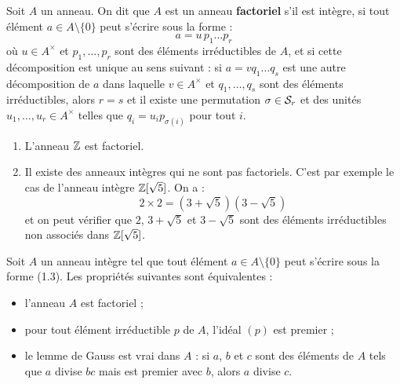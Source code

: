\documentclass[]{report}
\begin{document}
\begin{df}{}{}
    Soit $A$ un anneau. On dit que $A$ est un anneau \textbf{factoriel} s'il est intègre, si tout élément $a \in A \setminus \{0\}$ peut s'écrire sous la forme :
    \[a = u \, p_1 \dots p_r \tag{1.3}\]
    où $u \in A^{\times}$ et $p_1, \ldots, p_r$ sont des éléments irréductibles de $A$, et si cette décomposition est unique au sens suivant : si $a = vq_1 \ldots q_s$ est une autre décomposition de $a$ dans laquelle $v \in A^{\times}$ et $q_1, \ldots, q_s$ sont des éléments irréductibles, alors $r = s$ et il existe une permutation $\sigma \in \mathcal{S}_r$ et des unités $u_1, \ldots, u_r \in A^{\times}$ telles que $q_i = u_i p_{\sigma(i)}$ pour tout $i$.
\end{df}

\begin{ex}{}{}
    \begin{enumerate}
        \item L'anneau $\mathbb{Z}$ est factoriel.
        \item Il existe des anneaux intègres qui ne sont pas factoriels. C'est par exemple le cas de l'anneau intègre $\mathbb{Z}[\sqrt{5}]$. On a :
        \[2 \times 2 = (3 + \sqrt{5})(3 - \sqrt{5})\]
        et on peut vérifier que $2$, $3 + \sqrt{5}$ et $3 - \sqrt{5}$ sont des éléments irréductibles non associés dans $\mathbb{Z}[\sqrt{5}]$.
    \end{enumerate}
\end{ex}

\begin{prop}{}{}
    Soit $A$ un anneau intègre tel que tout élément $a \in A \setminus \{0\}$ peut s'écrire sous la forme (1.3). Les propriétés suivantes sont équivalentes :
    \begin{itemize}
        \item[(i)] l'anneau $A$ est factoriel ;
        \item[(ii)] pour tout élément irréductible $p$ de $A$, l'idéal $(p)$ est premier ;
        \item[(iii)] le lemme de Gauss est vrai dans $A$ : si $a$, $b$ et $c$ sont des éléments de $A$ tels que $a$ divise $bc$ mais est premier avec $b$, alors $a$ divise $c$.
    \end{itemize}
\end{prop}
\end{document}
